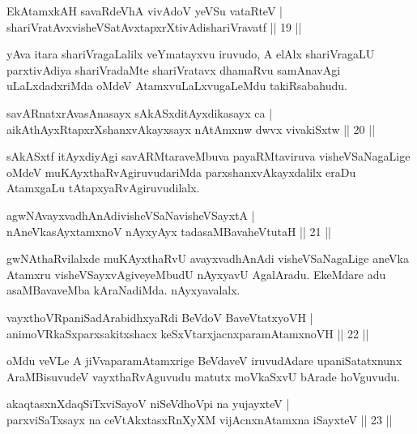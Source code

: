 \begin{shl}
EkAtamxkAH savaRdeVhA vivAdoV yeVSu vataRteV |\\
shariVratAvxvisheVSatAvxtapxrXtivAdishariVravatf \hfill || 19 ||
\end{shl}

\begin{artha}
yAva itara shariVragaLalilx veYmatayxvu iruvudo, A elAlx shariVragaLU parxtivAdiya shariVradaMte shariVratavx dhamaRvu samAnavAgi uLaLxdadxriMda oMdeV AtamxvuLaLxvugaLeMdu takiRsabahudu.
\end{artha}

\begin{shl}
savARnatxrAvasAnasayx sAkASxditAyxdikasayx ca |\\
aikAthAyxRtapxrXshanxvAkayxsayx nA\s \s tAmxnw dwvx vivakiSxtw \hfill || 20 ||
\end{shl}

\begin{artha}
sAkASxtf itAyxdiyAgi savARMtaraveMbuva payaRMtaviruva visheVSaNagaLige oMdeV muKAyxthaRvAgiruvudariMda parxshanxvAkayxdalilx eraDu AtamxgaLu tAtapxyaRvAgiruvudilalx.
\end{artha}

\begin{shl}
agwNAvayxvadhAnAdivisheVSaNavisheVSayxtA |\\
nAneVkasAyx\s \s tamxnoV nAyxyAyx tadasaMBavaheVtutaH \hfill || 21 ||
\end{shl}

\begin{artha}%
gwNAthaRvilalxde muKAyxthaRvU avayxvadhAnAdi visheVSaNagaLige aneVka Atamxru visheVSayxvAgiveyeMbudU nAyxyavU AgalAradu. EkeMdare adu asaMBavaveMba kAraNadiMda. nAyxyavalalx.
\end{artha}

\begin{shl}
vayxthoVRpaniSadArabidhxyaRdi BeVdoV BaveVtatxyoVH |\\
animoVRkaSxparxsakitxshacx keSxVtarxjacnxparamAtamxnoVH \hfill || 22 ||
\end{shl}

\begin{artha}
oMdu veVLe A jiVvaparamAtamxrige BeVdaveV iruvudAdare upaniSatatxnunx AraMBisuvudeV vayxthaRvAguvudu matutx moVkaSxvU bArade hoVguvudu. 
\end{artha}

\begin{shl}
akaqtasxnXdaqSiTxviSayoV niSeVdhoV\s pi na yujayxteV |\\
parxviSaTxsayx na ceVtAkxtasxRnXyXM vijAcnxnAtamxna iSayxteV \hfill || 23 ||
\end{shl}

